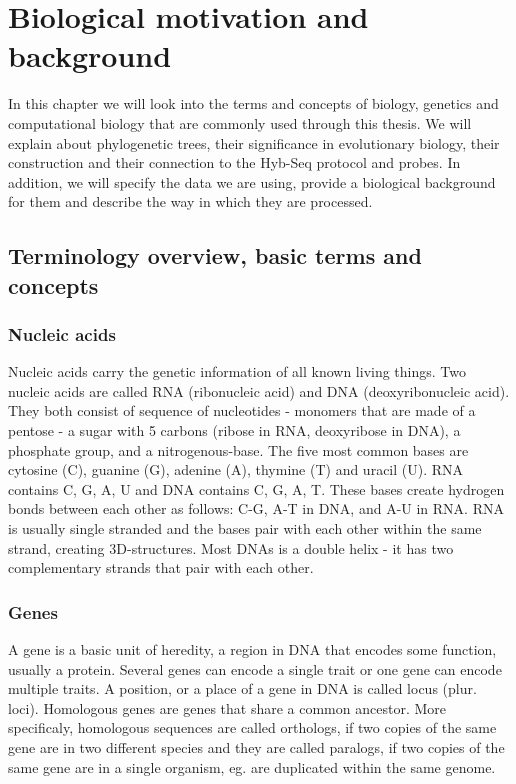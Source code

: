 \chapter[Biological motivation]{Biological motivation and background}
\label{kap:biological_motivation}

In this chapter we will look into the terms and concepts of biology, genetics and computational biology that 
are commonly used through this thesis. 
We will explain about phylogenetic trees, their significance in evolutionary biology, their construction and 
their connection to the Hyb-Seq protocol and probes. In addition, we will specify the data we are using, provide 
a biological background for them and describe the way in which they are processed. 

\section{Terminology overview, basic terms and concepts}

\subsection{Nucleic acids}
Nucleic acids carry the genetic information of all known living things. Two nucleic acids are called RNA 
(ribonucleic acid) and DNA (deoxyribonucleic acid). They both consist of sequence of nucleotides 
- monomers that are made of a pentose - a sugar with 5 carbons (ribose in RNA, deoxyribose in DNA), a 
phosphate group, and a nitrogenous-base. The five most common bases are cytosine (C), guanine (G), 
adenine (A), thymine (T) and uracil (U). RNA contains C, G, A, U and DNA contains C, G, A, T. These bases 
create hydrogen bonds between each other as follows: C-G, A-T in DNA, and A-U in RNA. 
RNA is usually single stranded and the bases pair with each other within the same strand, creating 3D-structures. 
Most DNAs is a double helix - it has two complementary strands that pair with each other. 

\subsection{Genes}
A gene is a basic unit of heredity, a region in DNA that encodes some function, usually a protein. Several genes 
can encode a single trait or one gene can encode multiple traits. A position, or a place of a gene in DNA is called 
locus (plur. loci). Homologous genes are genes that share a common ancestor. More specificaly, homologous sequences are 
called orthologs, if two copies of the same gene are in two different species and they are called paralogs, if two copies 
of the same gene are in a single organism, eg. are duplicated within the same genome. 

